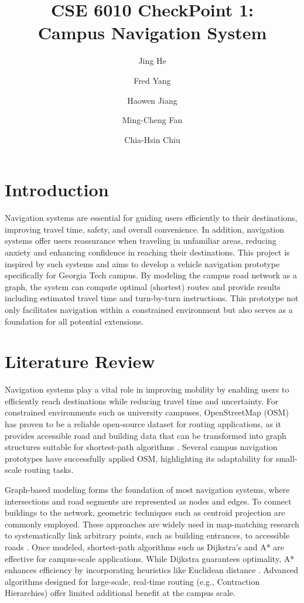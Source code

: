 \documentclass[fleqn,10pt]{olplainarticle}
\title{CSE 6010 CheckPoint 1: \\Campus Navigation System}
\author[1]{Jing He}
\author[2]{Fred Yang}
\author[3]{Haowen Jiang}
\author[4]{Ming-Cheng Fan}
\author[5]{Chia-Hsin Chiu}
\affil[1]{jhe468@gatech.edu}
\affil[2]{fred.yang@gatech.edu}
\affil[3]{hjiang401@gatech.edu}
\affil[4]{mfan77@gatech.edu}
\affil[5]{cchiu73@gatech.edu}
\begin{document}
\flushbottom
\maketitle
\thispagestyle{empty}


\section*{Introduction}
Navigation systems are essential for guiding users efficiently to their destinations, improving travel time, safety, and overall convenience. In addition, navigation systems offer users reassurance when traveling in unfamiliar areas, reducing anxiety and enhancing confidence in reaching their destinations. This project is inspired by such systems and aims to develop a vehicle navigation prototype specifically for Georgia Tech campus. By modeling the campus road network as a graph, the system can compute optimal (shortest) routes and provide results including estimated travel time and turn-by-turn instructions. This prototype not only facilitates navigation within a constrained environment but also serves as a foundation for all potential extensions. 

\section*{Literature Review}
Navigation systems play a vital role in improving mobility by enabling users to efficiently reach destinations while reducing travel time and uncertainty. For constrained environments such as university campuses, OpenStreetMap (OSM) has proven to be a reliable open-source dataset for routing applications, as it provides accessible road and building data that can be transformed into graph structures suitable for shortest-path algorithms \cite{10.1007/978-3-642-10601-9_13, s18020509}. Several campus navigation prototypes have successfully applied OSM, highlighting its adaptability for small-scale routing tasks.

Graph-based modeling forms the foundation of most navigation systems, where intersections and road segments are represented as nodes and edges. To connect buildings to the network, geometric techniques such as centroid projection are commonly employed. These approaches are widely used in map-matching research to systematically link arbitrary points, such as building entrances, to accessible roads \cite{Map-mappingResearch}. Once modeled, shortest-path algorithms such as Dijkstra’s and A* are effective for campus-scale applications. While Dijkstra guarantees optimality, A* enhances efficiency by incorporating heuristics like Euclidean distance \cite{madkour2017survey}. Advanced algorithms designed for large-scale, real-time routing (e.g., Contraction Hierarchies) offer limited additional benefit at the campus scale.
\end{document}
